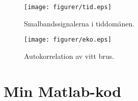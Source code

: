 \documentclass[10pt,twocolumn]{article}
\begin{document}
\begin{figure}[H]
	\begin{center}
		\texttt{[image: figurer/tid.eps]}
	\end{center}
	\caption{Smalbandssignalerna i tiddomänen.}
	\label{fig:tid}
\end{figure}

\begin{figure}[H]
	\begin{center}
		\texttt{[image: figurer/eko.eps]}
	\end{center}
	\caption{Autokorrelation av vitt brus.}
	\label{fig:eko}
\end{figure}

\newpage

\onecolumn
\appendix
\section{Min Matlab-kod} \label{app:code}

\end{document}
